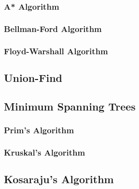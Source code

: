 \subsubsection{A* Algorithm}
\subsubsection{Bellman-Ford Algorithm}
\subsubsection{Floyd-Warshall Algorithm}
\subsection{Union-Find}
\subsection{Minimum Spanning Trees}
\subsubsection{Prim's Algorithm}
\subsubsection{Kruskal's Algorithm}
\subsection{Kosaraju's Algorithm}
